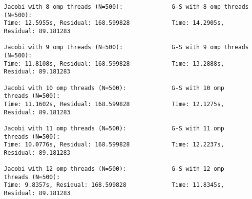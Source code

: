 \documentclass{article}
\begin{document}
\begin{lstlisting}
Jacobi with 8 omp threads (N=500):              G-S with 8 omp threads (N=500):
Time: 12.5955s, Residual: 168.599828            Time: 14.2905s, Residual: 89.181283
                        
Jacobi with 9 omp threads (N=500):              G-S with 9 omp threads (N=500):
Time: 11.8108s, Residual: 168.599828            Time: 13.2888s, Residual: 89.181283
                        
Jacobi with 10 omp threads (N=500):             G-S with 10 omp threads (N=500):
Time: 11.1602s, Residual: 168.599828            Time: 12.1275s, Residual: 89.181283
                        
Jacobi with 11 omp threads (N=500):             G-S with 11 omp threads (N=500):
Time: 10.0776s, Residual: 168.599828            Time: 12.2237s, Residual: 89.181283
                        
Jacobi with 12 omp threads (N=500):             G-S with 12 omp threads (N=500):
Time: 9.8357s, Residual: 168.599828             Time: 11.8345s, Residual: 89.181283
\end{lstlisting}
\end{document}
